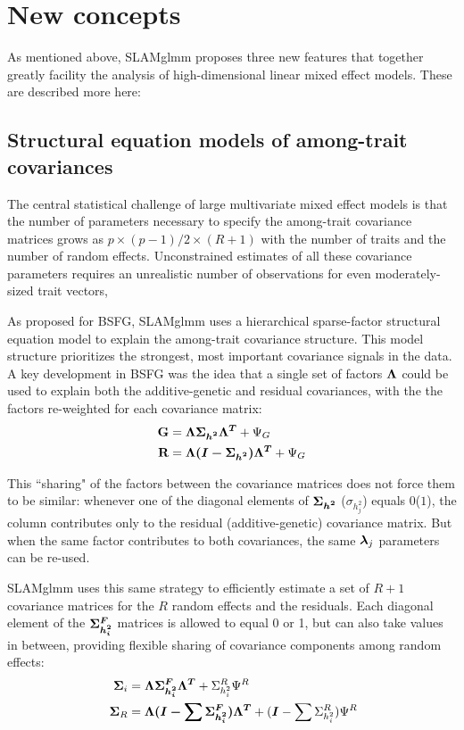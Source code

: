 \documentclass[11pt]{amsart}
\newcommand*{\B}[1]{\ifmmode\bm{#1}\else\textbf{#1}\fi}
\begin{document}
\section{New concepts}
As mentioned above, SLAMglmm proposes three new features that together greatly facility the analysis of high-dimensional linear mixed effect models. These are described more here:

\subsection{Structural equation models of among-trait covariances}
The central statistical challenge of large multivariate mixed effect models is that the number of parameters necessary to specify the among-trait covariance matrices grows as $p\times(p-1)/2 \times (R+1)$ with the number of traits and the number of random effects. Unconstrained estimates of all these covariance parameters requires an unrealistic number of observations for even moderately-sized trait vectors,

As proposed for BSFG, SLAMglmm uses a hierarchical sparse-factor structural equation model to explain the among-trait covariance structure. This model structure prioritizes the strongest, most important covariance signals in the data. A key development in BSFG was the idea that a single set of factors $\B{\Lambda}$ could be used to explain both the additive-genetic and residual covariances, with the the factors re-weighted for each covariance matrix:
\begin{align}\begin{split}
\B{G} &= \B{\Lambda \Sigma_{h^2} \Lambda^T} + \Psi_G \\
\B{R} &= \B{\Lambda (\B{I} - \Sigma_{h^2}) \Lambda^T} + \Psi_G \\
\end{split} \end{align}

This ``sharing" of the factors between the covariance matrices does not force them to be similar: whenever one of the diagonal elements of $\B{\Sigma_{h^2}}$ ($\sigma_{h^2_j}$) equals $0$($1$), the column contributes only to the residual (additive-genetic) covariance matrix. But when the same factor contributes to both covariances, the same $\B{\lambda}_j$ parameters can be re-used.

SLAMglmm uses this same strategy to efficiently estimate a set of $R+1$ covariance matrices for the $R$ random effects and the residuals. Each diagonal element of the $\B{\Sigma^F_{h^2_i}}$ matrices is allowed to equal 0 or 1, but can also take values in between, providing flexible sharing of covariance components among random effects:
\begin{align}\begin{split}
\;\B{\Sigma}_i &= \B{\Lambda \Sigma^F_{h^2_i} \Lambda^T} + \Sigma^R_{h^2_i}\Psi^R \\
\;\B{\Sigma}_R &= \B{\Lambda (\B{I} - \sum \Sigma^F_{h^2_i}) \Lambda^T} + (\B{I} - \sum \Sigma^R_{h^2_i})\Psi^R 
\end{split} \end{align}
\end{document}
